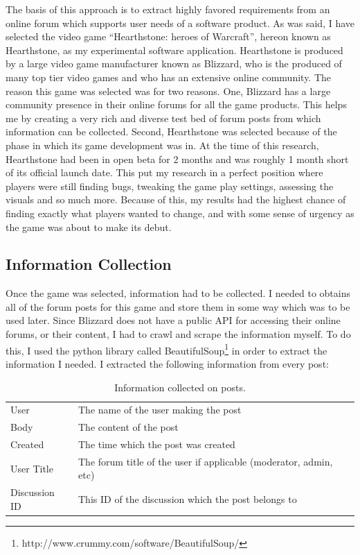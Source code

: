 \documentclass[conference]{IEEEtran}
\begin{document}
The basis of this approach is to extract highly favored requirements from an online forum which supports
user needs of a software product. As was said, I have selected the video game ``Hearthstone: heroes of Warcraft'',
hereon known as Hearthstone, as my experimental software application. Hearthstone is produced by a large
video game manufacturer known as Blizzard, who is the produced of many top tier video games and who has an
extensive online community. The reason this game was selected was for two reasons. One, Blizzard has a large
community presence in their online forums for all the game products. This helps me by creating a very
rich and diverse test bed of forum posts from which information can be collected. Second, Hearthstone was
selected because of the phase in which its game development was in. At the time of this research, Hearthstone
had been in open beta for 2 months and was roughly 1 month short of its official launch date. This put my
research in a perfect position where players were still finding bugs, tweaking the game play settings, 
assessing the visuals and so much more. Because of this, my results had the highest chance of finding
exactly what players wanted to change, and with some sense of urgency as the game was about to make its
debut.

\subsection{Information Collection}

Once the game was selected, information had to be collected. I needed to obtains all of the forum posts
for this game and store them in some way which was to be used later. Since Blizzard does not have a public API
for accessing their online forums, or their content, I had to crawl and scrape the information myself. To
do this, I used the python library called BeautifulSoup\footnote{http://www.crummy.com/software/BeautifulSoup/}
 in order to extract the information I needed. I extracted
the following information from every post:

\begin{table}[h]
\begin{center}
\begin{tabular}{| l | p{6cm} |}
\hline
User & The name of the user making the post \\
Body & The content of the post \\
Created & The time which the post was created \\
User Title & The forum title of the user if applicable (moderator, admin, etc) \\
Discussion ID & This ID of the discussion which the post belongs to \\
\hline
\end{tabular}
\end{center}
\caption{Information collected on posts.\label{tab:posts}}
\end{table}
\end{document}
